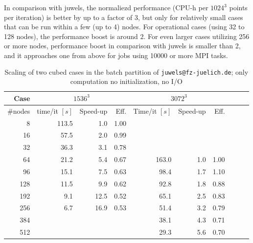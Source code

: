 In comparison with juwels, the normaliezd performance (CPU-h per $1024^3$ points per iteration) is better by up to a factor of $3$, but only for relatively small cases that can be run within a few (up to 4) nodes. For operational cases (using 32 to 128 nodes), the performance boost is around $2$. For even larger cases utilizing 256 or more nodes, performance boost in comparison with juwels is smaller than 2, and it approaches one from above for jobs using 10000 or more MPI tasks. 
%
\begin{table}
  \caption{Scaling of two cubed cases in the batch partition of \texttt{juwels@fz-juelich.de}; only computation no initialization, no I/O}
  {\footnotesize\begin{tabular}{r | r r r | r r r | rrr} 
    \toprule 
    Case   & \multicolumn{3}{c|}{$1536^3$} & \multicolumn{3}{c}{$3072^3$}\\
    \midrule
    \#nodes&        time/it $[s]$ & Speed-up & Eff. & Time/it $[s]$ & Speed-up & Eff.\\ 
    \midrule 
                        8 &      113.5&   1.0&  1.00 \\ 
    \rowcolor{gray!20} 16&        57.5&   2.0&  0.99\\ 
                       32&        36.3&   3.1&  0.78\\
    \rowcolor{gray!20} 64&        21.2&   5.4&  0.67& 163.0& 1.0& 1.00\\
                       96&        15.1&   7.5&  0.63&  98.4& 1.7& 1.10\\
    \rowcolor{gray!20}128&        11.5&   9.9&  0.62&  92.8& 1.8& 0.88\\
                      192&         9.1&  12.5&  0.52&  65.1& 2.5& 0.83\\
    \rowcolor{gray!20}256&         6.7&  16.9&  0.53&  51.4& 3.2& 0.79\\
                      384&                        &&&  38.1& 4.3& 0.71\\
    \rowcolor{gray!20}512&                        &&&  29.3& 5.6& 0.70\\ 
    \bottomrule
  \end{tabular}}
  \label{tab:scaling_juwels} 
\end{table}

